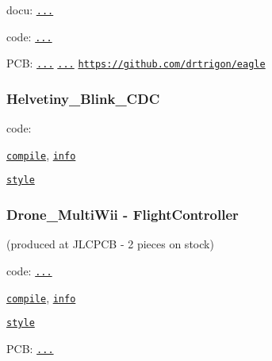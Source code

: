 docu\-: \href{https://rawgit.com/drtrigon/sketchbook/result/docu/doc/html/index.html}{\tt ...}

code\-: \href{https://travis-ci.org/drtrigon/sketchbook}{\tt ...}

P\-C\-B\-: \href{https://edrc.me/g/drtrigon/eagle}{\tt ...} \href{https://travis-ci.org/drtrigon/eagle}{\tt ...} \href{https://github.com/drtrigon/eagle}{\tt https\-://github.\-com/drtrigon/eagle}

\subsubsection*{Helvetiny\-\_\-\-Blink\-\_\-\-C\-D\-C}

code\-:
\begin{DoxyItemize}
\item \href{https://github.com/drtrigon/sketchbook/blob/result/docu/Helvetiny_Blink_CDC/Helvetiny_Blink_CDC.ino.compile}{\tt compile}, \href{https://github.com/drtrigon/sketchbook/blob/result/docu/Helvetiny_Blink_CDC/Helvetiny_Blink_CDC.ino.info}{\tt info}
\item \href{https://github.com/drtrigon/sketchbook/blob/result/docu/Helvetiny_Blink_CDC/Helvetiny_Blink_CDC.ino.style}{\tt style}
\end{DoxyItemize}

\subsubsection*{Drone\-\_\-\-Multi\-Wii -\/ Flight\-Controller}

(produced at J\-L\-C\-P\-C\-B -\/ 2 pieces on stock)

code\-: \href{https://travis-ci.org/drtrigon/docker-sketchbook}{\tt ...}
\begin{DoxyItemize}
\item \href{https://github.com/drtrigon/sketchbook/blob/result/docu/MultiWii_2_4/MultiWii/MultiWii.ino.compile}{\tt compile}, \href{https://github.com/drtrigon/sketchbook/blob/result/docu/MultiWii_2_4/MultiWii/MultiWii.ino.info}{\tt info}
\item \href{https://github.com/drtrigon/sketchbook/blob/result/docu/MultiWii_2_4/MultiWii/MultiWii.ino.style}{\tt style}
\end{DoxyItemize}

P\-C\-B\-:  \href{https://github.com/drtrigon/eagle/blob/result/pcb/projects/Drone_MultiWii/FlightController_sch.png}{\tt ...}

